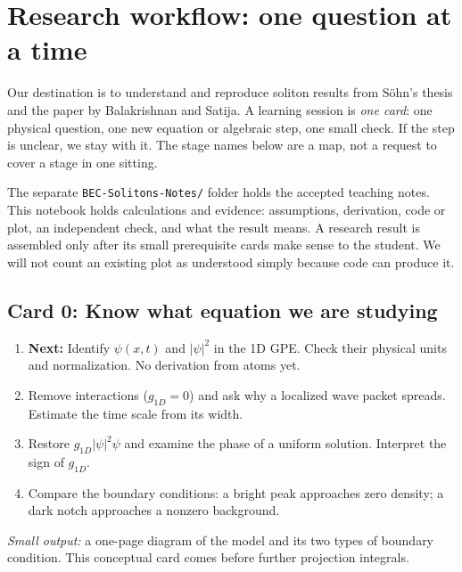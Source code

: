 \section{Research workflow: one question at a time}

Our destination is to understand and reproduce soliton results from S\"ohn's thesis and the paper by Balakrishnan and Satija. A learning session is \emph{one card}: one physical question, one new equation or algebraic step, one small check. If the step is unclear, we stay with it. The stage names below are a map, not a request to cover a stage in one sitting.

The separate \texttt{BEC-Solitons-Notes/} folder holds the accepted teaching notes. This notebook holds calculations and evidence: assumptions, derivation, code or plot, an independent check, and what the result means. A research result is assembled only after its small prerequisite cards make sense to the student. We will not count an existing plot as understood simply because code can produce it.

\subsection{Card 0: Know what equation we are studying}
\begin{enumerate}[label=0.\arabic*.,leftmargin=2.5em]
\item \textbf{Next:} Identify $\psi(x,t)$ and $|\psi|^2$ in the 1D GPE. Check their physical units and normalization. No derivation from atoms yet.
\item Remove interactions ($g_{1D}=0$) and ask why a localized wave packet spreads. Estimate the time scale from its width.
\item Restore $g_{1D}|\psi|^2\psi$ and examine the phase of a uniform solution. Interpret the sign of $g_{1D}$.
\item Compare the boundary conditions: a bright peak approaches zero density; a dark notch approaches a nonzero background.
\end{enumerate}
\noindent\emph{Small output:} a one-page diagram of the model and its two types of boundary condition. This conceptual card comes before further projection integrals.

